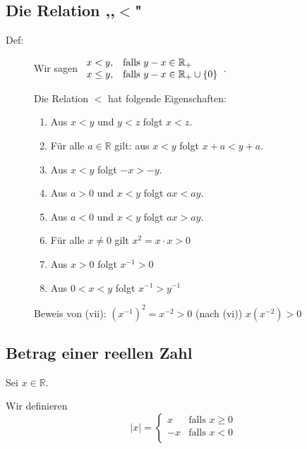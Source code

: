 \documentclass[12pt,a4paper,leqno]{article}
\begin{document}
  \subsection*{Die Relation ,,$\mathbf{<}$"}
  \begin{description}
    \item[Def:] Wir sagen 
      $\begin{array}{l l}
        x < y,    & \textrm{falls } y - x \in \mathbb{R}_+ \\
        x \leq y,   & \textrm{falls } y - x \in \mathbb{R}_+ \cup \lbrace 0 \rbrace
      \end{array}$.
      
      Die Relation $<$ hat folgende Eigenschaften:
      
      \renewcommand{\theenumi}{(\roman{enumi})}
      \begin{enumerate}
        \item Aus $x < y$ und $y < z$ folgt $x < z$.
        \item Für alle $a \in \mathbb{R}$ gilt: aus $x < y$ folgt $x + a < y + a$.
        \item Aus $x < y$ folgt $-x > -y$.
        \item Aus $a > 0$ und $x < y$ folgt $ax < ay$.
        \item Aus $a < 0$ und $x < y$ folgt $ax > ay$.
        \item Für alle $x \neq 0$ gilt $x^2 = x  \cdot  x > 0$
        \item Aus $x > 0$ folgt $x^{-1} > 0$
        \item Aus $0 < x < y$ folgt $x^{-1} > y^{-1}$
      \end{enumerate}
      Beweis von (vii): $(x^{-1})^{2}=x^{-2} > 0$ (nach (vi)) $ x(x^{-2})>0$
      
  \end{description}
  \subsection*{Betrag einer reellen Zahl}
  
  Sei $x \in \mathbb{R}$.
  
  Wir definieren 
  \begin{equation*}
    |x| = 
    \begin{cases}
      x & \textrm{falls } x \geq 0\\
      -x & \textrm{falls } x < 0\\
    \end{cases}
  \end{equation*}
  
\end{document}
